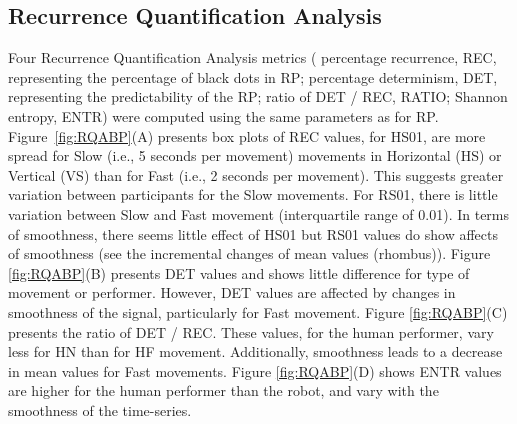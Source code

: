 \documentclass[fleqn,10pt]{wlscirep}
\begin{document}
\subsection*{Recurrence Quantification Analysis} \label{ch6:rqas}
Four Recurrence Quantification Analysis metrics (
percentage recurrence, REC, representing the percentage of black dots in RP; 
percentage determinism, DET, representing the predictability of the RP; 
ratio of DET / REC, RATIO; Shannon entropy, ENTR) 
were computed using the same parameters as for RP.
Figure~\ref{fig:RQABP}(A) presents box plots of REC values, 
for HS01, are more spread for Slow (i.e., 5 seconds per movement) movements 
in Horizontal (HS) or Vertical (VS) than for Fast (i.e., 2 seconds per movement).  
This suggests greater variation between participants for the Slow movements.  
For RS01, there is little variation between Slow and Fast movement
(interquartile range of 0.01). 
In terms of smoothness, there seems little effect of HS01 but RS01 values 
do show affects of smoothness (see the incremental changes of mean values (rhombus)).
Figure \ref{fig:RQABP}(B) presents DET values and shows 
little difference for type of movement or performer.  
However, DET values are affected by changes in smoothness of the signal, 
particularly for Fast movement.
Figure \ref{fig:RQABP}(C) presents the ratio of DET / REC. 
These values, for the human performer, vary less for HN than for HF movement.  
Additionally, smoothness leads to a decrease in mean values for Fast movements.
Figure \ref{fig:RQABP}(D) shows ENTR values are higher for the human 
performer than the robot, and vary with the smoothness of the time-series.
\end{document}

